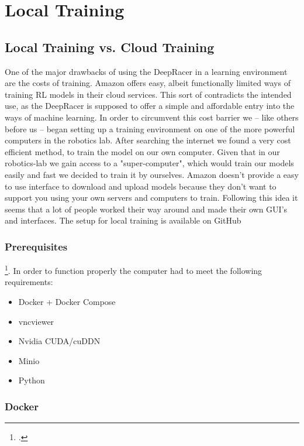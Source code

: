 \chapter{Local Training}

\section{Local Training vs. Cloud Training}
One of the major drawbacks of using the DeepRacer in a learning environment are the costs of training. Amazon offers easy, albeit functionally limited ways of training RL models in their cloud services. This sort of contradicts the intended use, as the DeepRacer is supposed to offer a simple and affordable entry into the ways of machine learning.
 In order to circumvent this cost barrier we -- like others before us -- began setting up a training environment on one of the more powerful computers in the robotics lab. After searching the internet we found a very cost efficient method, to train the model on our own computer. Given that in our robotics-lab we gain access to a "super-computer", which would train our models easily and fast we decided to train it by ourselves. Amazon doesn't provide a easy to use interface to download and upload models because they don't want to support you using your own servers and computers to train. Following this idea it seems that a lot of people worked their way around and made their own GUI's and interfaces.
 The setup for local training is available on GitHub 

\subsection{Prerequisites}
\footcite{https://github.com/aws-deepracer-community/deepracer}. In order to function properly the computer had to meet the following requirements:

\begin{itemize}
 \item Docker + Docker Compose
 \item vncviewer 
 \item Nvidia CUDA/cuDDN 
 \item Minio
 \item Python
\end{itemize}

\subsection{Docker}

